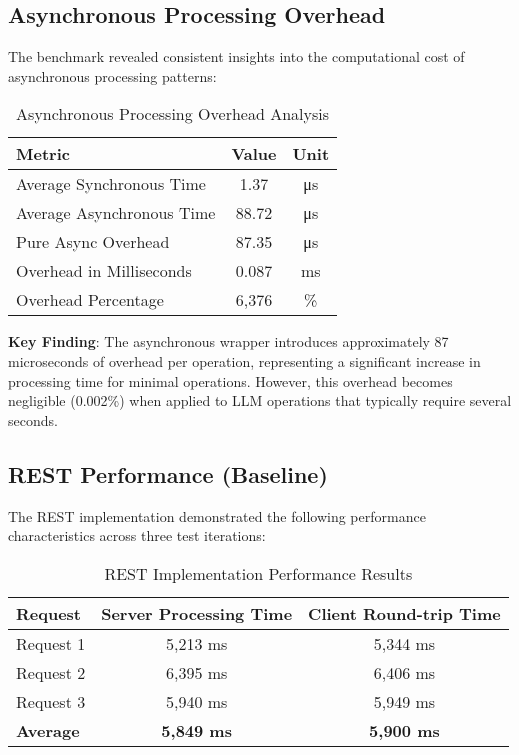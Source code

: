 \subsection{Asynchronous Processing Overhead}

The benchmark revealed consistent insights into the computational cost of asynchronous processing patterns:

\begin{table}[h]
\centering
\caption{Asynchronous Processing Overhead Analysis}
\begin{tabular}{|l|c|c|}
\hline
\textbf{Metric} & \textbf{Value} & \textbf{Unit} \\
\hline
Average Synchronous Time & 1.37 & μs \\
\hline
Average Asynchronous Time & 88.72 & μs \\
\hline
Pure Async Overhead & 87.35 & μs \\
\hline
Overhead in Milliseconds & 0.087 & ms \\
\hline
Overhead Percentage & 6,376 & \% \\
\hline
\end{tabular}
\end{table}

\textbf{Key Finding}: The asynchronous wrapper introduces approximately 87 microseconds of overhead per operation, representing a significant increase in processing time for minimal operations. However, this overhead becomes negligible (0.002\%) when applied to LLM operations that typically require several seconds.

\subsection{REST Performance (Baseline)}

The REST implementation demonstrated the following performance characteristics across three test iterations:

\begin{table}[h]
\centering
\caption{REST Implementation Performance Results}
\begin{tabular}{|l|c|c|}
\hline
\textbf{Request} & \textbf{Server Processing Time} & \textbf{Client Round-trip Time} \\
\hline
Request 1 & 5,213 ms & 5,344 ms \\
\hline
Request 2 & 6,395 ms & 6,406 ms \\
\hline
Request 3 & 5,940 ms & 5,949 ms \\
\hline
\textbf{Average} & \textbf{5,849 ms} & \textbf{5,900 ms} \\
\hline
\end{tabular}
\end{table}

